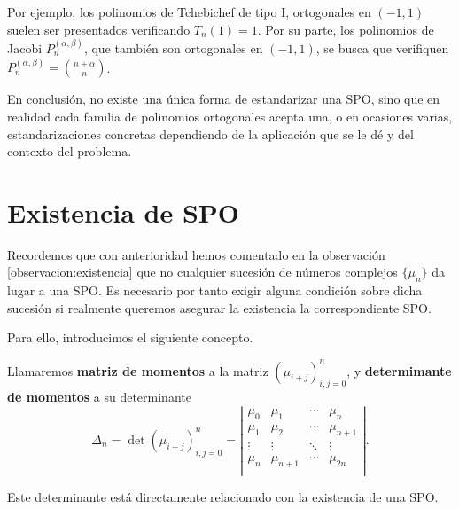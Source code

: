 Por ejemplo, los polinomios de Tchebichef de tipo I, ortogonales en $(-1,1)$ suelen ser presentados verificando $T_n(1)=1$. Por su parte, los polinomios de Jacobi $P_n^{(\alpha,\beta)}$, que también son ortogonales en $(-1,1)$, se busca que verifiquen $P_n^{(\alpha,\beta)}=\binom{n+\alpha}{n}$.

En conclusión, no existe una única forma de estandarizar una SPO, sino que en realidad cada familia de polinomios ortogonales acepta una, o en ocasiones varias, estandarizaciones concretas dependiendo de la aplicación que se le dé y del contexto del problema.

\section{Existencia de SPO}
\label{section:existencia-SPO}

Recordemos que con anterioridad hemos comentado en la observación \ref{observacion:existencia} que no cualquier sucesión de números complejos $\{\mu_n\}$ da lugar a una SPO. Es necesario por tanto exigir alguna condición sobre dicha sucesión si realmente queremos asegurar la existencia la correspondiente SPO.

Para ello, introducimos el siguiente concepto.

\begin{definicion}
    Llamaremos \textbf{matriz de momentos} a la matriz $(\mu_{i+j})_{i,j=0}^n$, y \textbf{determimante de momentos} a su determinante
    \begin{equation}
        \label{eq:determinante}
        \Delta_n = \det(\mu_{i+j})_{i,j=0}^n = \left|\begin{array}{cccc}
            \mu_0 & \mu_1 & \cdots & \mu_n \\
            \mu_1 & \mu_2 & \cdots & \mu_{n+1} \\
            \vdots & \vdots & \ddots & \vdots \\
            \mu_n & \mu_{n+1} & \cdots & \mu_{2n} \\
        \end{array}\right|.
    \end{equation}
\end{definicion}

Este determinante está directamente relacionado con la existencia de una SPO.

